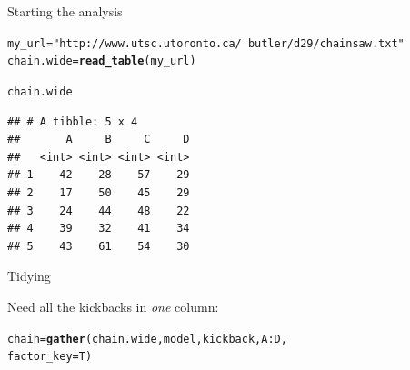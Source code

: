 \documentclass[unknownkeysallowed]{beamer}\usepackage[]{graphicx}\usepackage[]{color}
\makeatletter
\newcommand{\hlstr}[1]{\textcolor[rgb]{0.192,0.494,0.8}{#1}}%
\newcommand{\hlopt}[1]{\textcolor[rgb]{0,0,0}{#1}}%
\newcommand{\hlstd}[1]{\textcolor[rgb]{0.345,0.345,0.345}{#1}}%
\newcommand{\hlkwb}[1]{\textcolor[rgb]{0.69,0.353,0.396}{#1}}%
\newcommand{\hlkwc}[1]{\textcolor[rgb]{0.333,0.667,0.333}{#1}}%
\newcommand{\hlkwd}[1]{\textcolor[rgb]{0.737,0.353,0.396}{\textbf{#1}}}%
\newenvironment{kframe}{%
 \def\at@end@of@kframe{}%
 \ifinner\ifhmode%
  \def\at@end@of@kframe{\end{minipage}}%
  \begin{minipage}{\columnwidth}%
 \fi\fi%
 \def\FrameCommand##1{\hskip\@totalleftmargin \hskip-\fboxsep
 \colorbox{shadecolor}{##1}\hskip-\fboxsep
     \hskip-\linewidth \hskip-\@totalleftmargin \hskip\columnwidth}%
 \MakeFramed {\advance\hsize-\width
   \@totalleftmargin\z@ \linewidth\hsize
   \@setminipage}}%
 {\par\unskip\endMakeFramed%
 \at@end@of@kframe}
\newenvironment{knitrout}{}{} %
\makeatother
\begin{document}
\begin{frame}[fragile]{Starting the analysis}
  
\begin{knitrout}\footnotesize
{}\color{fgcolor}\begin{kframe}
\begin{alltt}
\hlstd{my_url}\hlkwb{=}\hlstr{"http://www.utsc.utoronto.ca/~butler/d29/chainsaw.txt"}
\hlstd{chain.wide}\hlkwb{=}\hlkwd{read_table}\hlstd{(my_url)}
\end{alltt}


{\ttfamily\noindent\itshape\color{messagecolor}{\#\# Parsed with column specification:\\\#\# cols(\\\#\#\ \  A = col\_integer(),\\\#\#\ \  B = col\_integer(),\\\#\#\ \  C = col\_integer(),\\\#\#\ \  D = col\_integer()\\\#\# )}}\begin{alltt}
\hlstd{chain.wide}
\end{alltt}
\begin{verbatim}
## # A tibble: 5 x 4
##       A     B     C     D
##   <int> <int> <int> <int>
## 1    42    28    57    29
## 2    17    50    45    29
## 3    24    44    48    22
## 4    39    32    41    34
## 5    43    61    54    30
\end{verbatim}
\end{kframe}
\end{knitrout}

  
\end{frame}

\begin{frame}[fragile]{Tidying}
  
Need all the kickbacks in \emph{one} column:

\begin{knitrout}
\color{fgcolor}\begin{kframe}
\begin{alltt}
\hlstd{chain}\hlkwb{=}\hlkwd{gather}\hlstd{(chain.wide,model,kickback,A}\hlopt{:}\hlstd{D,}
  \hlkwc{factor_key}\hlstd{=T)}
\end{alltt}
\end{kframe}
\end{knitrout}
  
  
\end{frame}
\end{document}
